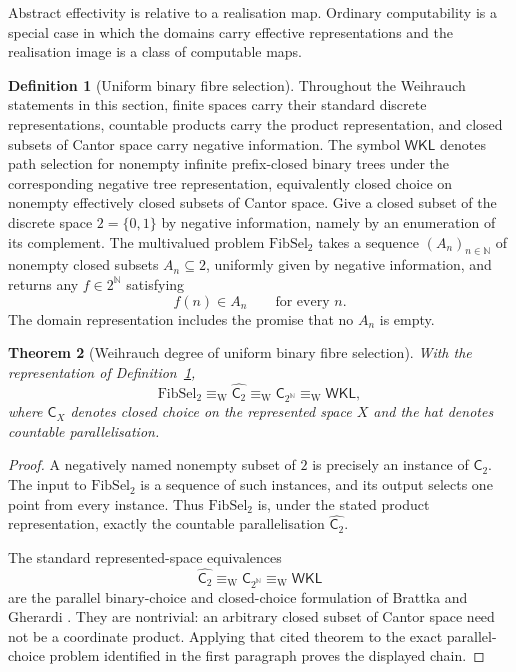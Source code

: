 \documentclass[11pt]{article}
\theoremstyle{plain}
\newtheorem{theorem}{Theorem}[section]
\theoremstyle{definition}
\newtheorem{definition}[theorem]{Definition}
\theoremstyle{remark}
\newcommand{\N}{\mathbb{N}}
\begin{document}
Abstract effectivity is relative to a realisation map. Ordinary computability is
a special case in which the domains carry effective representations and the
realisation image is a class of computable maps.

\begin{definition}[Uniform binary fibre selection]
\label{def:fibsel-weihrauch}
Throughout the Weihrauch statements in this section, finite spaces carry their
standard discrete representations, countable products carry the product
representation, and closed subsets of Cantor space carry negative information.
The symbol $\mathsf{WKL}$ denotes path selection for nonempty infinite
prefix-closed binary trees under the corresponding negative tree representation,
equivalently closed choice on nonempty effectively closed subsets of Cantor
space. Give a closed subset of the discrete space $2=\{0,1\}$ by negative
information, namely by an enumeration of its complement. The multivalued
problem $\mathrm{FibSel}_2$ takes a sequence $(A_n)_{n\in\N}$ of nonempty closed
subsets $A_n\subseteq2$, uniformly given by negative information, and returns
any $f\in2^\N$ satisfying
\[
f(n)\in A_n\qquad\text{for every }n.
\]
The domain representation includes the promise that no $A_n$ is empty.
\end{definition}

\begin{theorem}[Weihrauch degree of uniform binary fibre selection]
\label{thm:fibsel-weihrauch}
With the representation of Definition~\ref{def:fibsel-weihrauch},
\[
\mathrm{FibSel}_2
\equiv_{\mathrm W}
\widehat{\mathsf C_2}
\equiv_{\mathrm W}
\mathsf C_{2^\N}
\equiv_{\mathrm W}
\mathsf{WKL},
\]
where $\mathsf C_X$ denotes closed choice on the represented space $X$ and the
hat denotes countable parallelisation.
\end{theorem}

\begin{proof}
A negatively named nonempty subset of $2$ is precisely an instance of
$\mathsf C_2$. The input to $\mathrm{FibSel}_2$ is a sequence of such instances,
and its output selects one point from every instance. Thus
$\mathrm{FibSel}_2$ is, under the stated product representation, exactly the
countable parallelisation $\widehat{\mathsf C_2}$.

The standard represented-space equivalences
\[
\widehat{\mathsf C_2}
\equiv_{\mathrm W}\mathsf C_{2^\N}
\equiv_{\mathrm W}\mathsf{WKL}
\]
are the parallel binary-choice and closed-choice formulation of
Brattka and Gherardi \cite{brattkagherardi}. They are nontrivial:
an arbitrary closed subset of Cantor space need not be a coordinate product.
Applying that cited theorem to the exact parallel-choice problem identified in
the first paragraph proves the displayed chain.
\end{proof}
\end{document}
